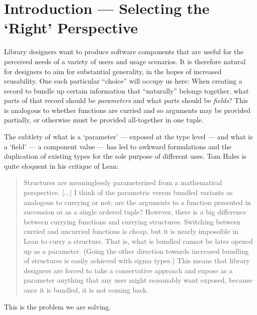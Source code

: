 \documentclass[sigplan,screen]{acmart}
\begin{document}


\section{Introduction --- Selecting the ‘Right’ Perspective}
\label{sec:orgbc9b6b0}

Library designers want to produce software components that are useful for
the perceived needs of a variety of users and usage scenarios.  It is therefore
natural for designers to aim for substantial generality, in the hopes of increased
reusability. One such particular ``choice'' will occupy us here: When creating a
record to bundle up certain information that “naturally” belongs together, what
parts of that record should be \emph{parameters} and what parts should be
\emph{fields}? This is analogous to whether functions are curried and so arguments
may be provided partially, or otherwise must be provided all-together in one tuple.

The subtlety of what is a ‘parameter’ --- exposed at the type level --- and what is a
‘field’ --- a component value --- has led to awkward formulations and
the duplication of existing types for the sole purpose of different uses.
Tom Hales \cite{Hales-blog-post} is quite eloquent in his critique of Lean:
\begin{quote}
  Structures are meaninglessly parameterized from a mathematical perspective.
  [...] I think of the parametric versus bundled variants as analogous to currying
  or not; are the arguments to a function presented in succession or as a single
  ordered tuple? However, there is a big difference between currying functions
  and currying structures. Switching between curried and uncurried functions is
  cheap, but it is nearly impossible in Lean to curry a structure. That is, what
  is bundled cannot be later opened up as a parameter. (Going the other direction
  towards increased bundling of structures is easily achieved with sigma types.)
 This means that library designers are forced to take a conservative approach and
 expose as a parameter anything that any user might reasonably want exposed, because
 once it is bundled, it is not coming back.
\end{quote}
This is the problem we are solving.
\end{document}
